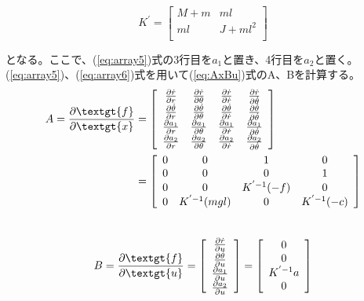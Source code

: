 	\begin{equation}
		K^{'} = \left[
		\begin{array}{ccc}
			M + m & ml\\
			ml & J+ml^{2}\\
		\end{array}
		\right]
		\label{eq:array6}
	\end{equation}
	
	となる。ここで、(\ref{eq:array5})式の3行目を$a_{1}$と置き、4行目を$a_{2}$と置く。\\\newpage
	(\ref{eq:array5})、(\ref{eq:array6})式を用いて(\ref{eq:AxBu})式のA、Bを計算する。\\
	
	\begin{align*}
		A=\frac{\partial \textgt{f}}{\partial \textgt{x}}&=
		\left[
		\begin{array}{cccc}
			\frac{\partial \dot{r}}{\partial r} & \frac{\partial \dot{r}}{\partial \theta} & \frac{\partial \dot{r}}{\partial \dot{r}} & \frac{\partial \dot{r}}{\partial \dot{\theta}} \\
			\frac{\partial \dot{\theta}}{\partial r} & \frac{\partial \dot{\theta}}{\partial \theta} & \frac{\partial \dot{\theta}}{\partial \dot{r}} & \frac{\partial \dot{\theta}}{\partial \dot{\theta}} \\
			\frac{\partial a_{1}}{\partial r} & \frac{\partial a_{1}}{\partial \theta} & \frac{\partial a_{1}}{\partial \dot{r}} & \frac{\partial a_{1}}{\partial \dot{\theta}} \\
			\frac{\partial a_{2}}{\partial r} & \frac{\partial a_{2}}{\partial \theta} & \frac{\partial a_{2}}{\partial \dot{r}} & \frac{\partial a_{2}}{\partial \dot{\theta}} \\
		\end{array} 
		\right]  \\
		&=\left[
		\begin{array}{cccc}
			0 & 0 & 1 & 0 \\
			0 & 0 & 0 & 1 \\
			0 & 0 & K^{'-1}(-f) & 0\\
			0 & K^{'-1}(mgl) & 0 & K^{'-1}(-c) \\
		\end{array}
		\right]
	\end{align*}
	\\
	\[
		B=\frac{\partial \textgt{f}}{\partial \textgt{u}}=
		\left[
		\begin{array}{c}
			\frac{\partial \dot{r}}{\partial u}\\
			\frac{\partial \dot{\theta}}{\partial u}\\
			\frac{\partial a_{1}}{\partial u}\\
			\frac{\partial a_{2}}{\partial u}\\
		\end{array}
		\right]=
		\left[
		\begin{array}{c}
			0\\
			0\\
			K^{'-1}a\\
			0\\
		\end{array}
		\right]
		\label{eq:array7}
	\]
